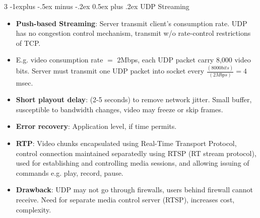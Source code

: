\documentclass[8pt, a4paper, landscape]{article}
\makeatletter
\renewcommand{\subsection}{\@startsection{subsection}{2}{0.1mm}%
                                {-1explus -.5ex minus -.2ex}%
                                {0.5ex plus .2ex}%
                                {\normalfont\normalsize\bfseries}}
\makeatother
\begin{document}
\begin{multicols*}{3}
\subsection{UDP Streaming}
\begin{itemize}
\item \textbf	{Push-based Streaming}: Server transmit client’s consumption rate. UDP has no congestion control mechanism, transmit w/o rate-control restrictions of TCP.
\item E.g. video consumption rate $=$ 2Mbps, each UDP packet carry 8,000 video bits. Server must transmit one UDP packet into socket every $\frac{(8000 bits)}{(2 Mbps)} = 4$ msec.
\item \textbf{Short playout delay}: (2-5 seconds) to remove network jitter. Small buffer, susceptible to bandwidth changes, video may freeze or skip frames.
\item \textbf{Error recovery}: Application level, if time permits.
\item \textbf{RTP}: Video chunks encapsulated using Real-Time Transport Protocol, control connection maintained separatedly using RTSP (RT stream protocol), used for establishing and controlling media sessions, and allowing issuing of commands e.g. play, record, pause.
\item \textbf{Drawback}: UDP may not go through firewalls, users behind firewall cannot receive. Need for separate media control server (RTSP), increases cost, complexity.
\end{itemize}


\end{multicols*}
\end{document}
